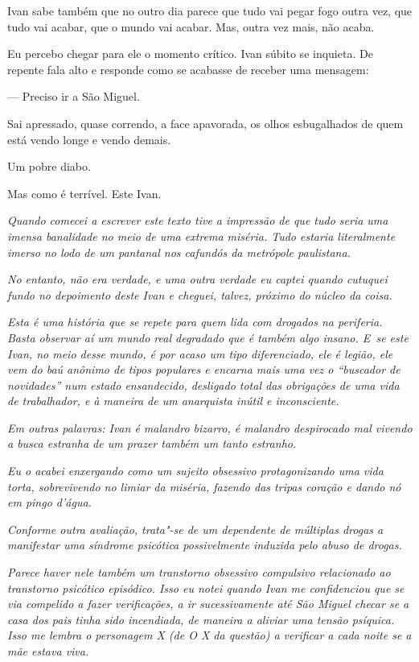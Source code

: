Ivan sabe também que no outro dia parece que tudo vai pegar fogo outra
vez, que tudo vai acabar, que o mundo vai acabar. Mas, outra vez mais,
não acaba.

\asterisc{}

Eu percebo chegar para ele o momento crítico. Ivan súbito se inquieta.
De repente fala alto e responde como se acabasse de receber uma
mensagem:

— Preciso ir a São Miguel.

Sai apressado, quase correndo, a face apavorada, os olhos esbugalhados
de quem está vendo longe e vendo demais.

Um pobre diabo.

Mas como é terrível. Este Ivan.

\begin{center}\asterisc{}\end{center}

\emph{Quando comecei a escrever este texto tive a impressão de que tudo
seria uma imensa banalidade no meio de uma extrema miséria. Tudo estaria
literalmente imerso no lodo de um pantanal nos cafundós da metrópole
paulistana.}

\emph{No entanto, não era verdade, e uma outra verdade eu captei quando
cutuquei fundo no depoimento deste Ivan e cheguei, talvez, próximo do
núcleo da coisa.}

\emph{Esta é uma história que se repete para quem lida com drogados na
periferia. Basta observar aí um mundo real degradado que é também algo
insano. E~se este Ivan, no meio desse mundo, é por acaso um tipo
diferenciado, ele é legião, ele vem do baú anônimo de tipos populares e
encarna mais uma vez o ``buscador de novidades'' num estado ensandecido,
desligado total das obrigações de uma vida de trabalhador, e à maneira
de um anarquista inútil e inconsciente.}

\emph{Em outras palavras: Ivan é malandro bizarro, é malandro
despirocado mal vivendo a busca estranha de um prazer também um tanto
estranho.}

\emph{Eu o acabei enxergando como um sujeito obsessivo protagonizando
uma vida torta, sobrevivendo no limiar da miséria, fazendo das tripas
coração e dando nó em pingo d'água.}

\emph{Conforme outra avaliação, trata"-se de um dependente de múltiplas
drogas a manifestar uma síndrome psicótica possivelmente induzida pelo
abuso de drogas.}

\emph{Parece haver nele também um transtorno obsessivo compulsivo
relacionado ao transtorno psicótico episódico. Isso eu notei quando Ivan
me confidenciou que se via compelido a fazer verificações, a ir
sucessivamente até São Miguel checar se a casa dos pais tinha sido
incendiada, de maneira a aliviar uma tensão psíquica. Isso me lembra o
personagem X (de O X da questão) a verificar a cada noite se a mãe
estava viva.}


